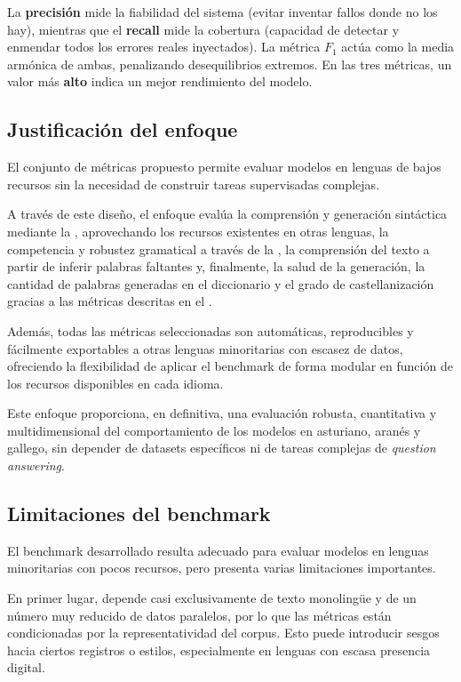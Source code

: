 La \textbf{precisión} mide la fiabilidad del sistema (evitar inventar fallos donde no los hay), mientras que el \textbf{recall} mide la cobertura (capacidad de detectar y enmendar todos los errores reales inyectados). La métrica $F_1$ actúa como la media armónica de ambas, penalizando desequilibrios extremos. En las tres métricas, un valor más \textbf{alto} indica un mejor rendimiento del modelo.

\subsection{Justificación del enfoque}

El conjunto de métricas propuesto permite evaluar modelos en lenguas de bajos recursos sin la necesidad de construir tareas supervisadas complejas. 

A través de este diseño, el enfoque evalúa la comprensión y generación sintáctica mediante la , aprovechando los recursos existentes en otras lenguas, la competencia y robustez gramatical a través de la , la comprensión del texto a partir de inferir palabras faltantes  y, finalmente, la salud de la generación, la cantidad de palabras generadas en el diccionario y el grado de castellanización gracias a las métricas descritas en el .

Además, todas las métricas seleccionadas son automáticas, reproducibles y fácilmente exportables a otras lenguas minoritarias con escasez de datos, ofreciendo la flexibilidad de aplicar el benchmark de forma modular en función de los recursos disponibles en cada idioma. 

Este enfoque proporciona, en definitiva, una evaluación robusta, cuantitativa y multidimensional del comportamiento de los modelos en asturiano, aranés y gallego, sin depender de datasets específicos ni de tareas complejas de \textit{question answering}.

\subsection{Limitaciones del benchmark}

El benchmark desarrollado resulta adecuado para evaluar modelos en lenguas minoritarias con pocos recursos, pero presenta varias limitaciones importantes.

En primer lugar, depende casi exclusivamente de texto monolingüe y de un número muy reducido de datos paralelos, por lo que las métricas están condicionadas por la representatividad del corpus. Esto puede introducir sesgos hacia ciertos registros o estilos, especialmente en lenguas con escasa presencia digital.

